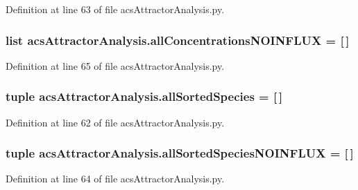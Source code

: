 Definition at line 63 of file acs\-Attractor\-Analysis.\-py.

\hypertarget{a00091_acda16f4751633455ab19e92bdc5baf2a}{
\subsubsection[{all\-Concentrations\-N\-O\-I\-N\-F\-L\-U\-X}]{\setlength{\rightskip}{0pt plus 5cm}list acs\-Attractor\-Analysis.\-all\-Concentrations\-N\-O\-I\-N\-F\-L\-U\-X = \mbox{[}$\,$\mbox{]}}}\label{a00091_acda16f4751633455ab19e92bdc5baf2a}


Definition at line 65 of file acs\-Attractor\-Analysis.\-py.

\hypertarget{a00091_aafc595063b7c4b74f94c0931ff2370a5}{
\subsubsection[{all\-Sorted\-Species}]{\setlength{\rightskip}{0pt plus 5cm}tuple acs\-Attractor\-Analysis.\-all\-Sorted\-Species = \mbox{[}$\,$\mbox{]}}}\label{a00091_aafc595063b7c4b74f94c0931ff2370a5}


Definition at line 62 of file acs\-Attractor\-Analysis.\-py.

\hypertarget{a00091_a02a8db664a67956bc698b79f7c31a7bd}{
\subsubsection[{all\-Sorted\-Species\-N\-O\-I\-N\-F\-L\-U\-X}]{\setlength{\rightskip}{0pt plus 5cm}tuple acs\-Attractor\-Analysis.\-all\-Sorted\-Species\-N\-O\-I\-N\-F\-L\-U\-X = \mbox{[}$\,$\mbox{]}}}\label{a00091_a02a8db664a67956bc698b79f7c31a7bd}


Definition at line 64 of file acs\-Attractor\-Analysis.\-py.

